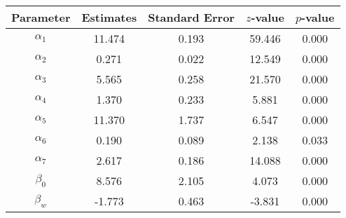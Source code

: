 \begin{table}[ht]
\centering
\begin{tabular}{ccccc}
  \hline
Parameter & Estimates & Standard Error & $z$-value & $p$-value \\ 
  \hline
$\alpha_1$ & 11.474 & 0.193 & 59.446 & 0.000 \\ 
  $\alpha_2$ & 0.271 & 0.022 & 12.549 & 0.000 \\ 
  $\alpha_3$ & 5.565 & 0.258 & 21.570 & 0.000 \\ 
  $\alpha_4$ & 1.370 & 0.233 & 5.881 & 0.000 \\ 
  $\alpha_5$ & 11.370 & 1.737 & 6.547 & 0.000 \\ 
  $\alpha_6$ & 0.190 & 0.089 & 2.138 & 0.033 \\ 
  $\alpha_7$ & 2.617 & 0.186 & 14.088 & 0.000 \\ 
  $\beta_0$ & 8.576 & 2.105 & 4.073 & 0.000 \\ 
  $\beta_w$ & -1.773 & 0.463 & -3.831 & 0.000 \\ 
   \hline
\end{tabular}
\end{table}
